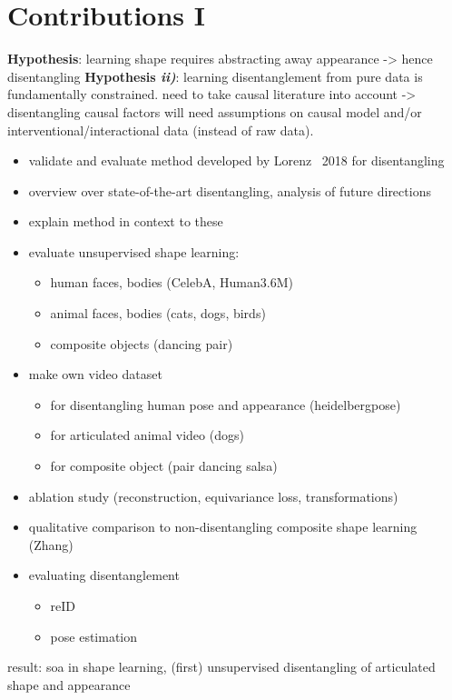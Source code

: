 \section{Contributions I}
	\textbf{Hypothesis}: learning shape requires abstracting away appearance -> hence disentangling
	\textbf{Hypothesis \emph{ii)}}: learning disentanglement from pure data is fundamentally constrained. need to take causal literature into account -> disentangling causal factors will need assumptions on causal model and/or interventional/interactional data (instead of raw data).
	\begin{itemize}
		\item validate and evaluate method developed by Lorenz \etal\ 2018 for disentangling
		\item overview over state-of-the-art disentangling, analysis of future directions
		\item explain method in context to these
		\item evaluate unsupervised shape learning:
			\begin{itemize}
				\item human faces, bodies (CelebA, Human3.6M)
				\item animal faces, bodies (cats, dogs, birds)
				\item composite objects (dancing pair)
			\end{itemize}
		\item make own video dataset
			\begin{itemize}
				\item for disentangling human pose and appearance (heidelbergpose)
				\item for articulated animal video (dogs)
				\item for composite object (pair dancing salsa)
			\end{itemize}
		\item ablation study (reconstruction, equivariance loss, transformations)
		\item qualitative comparison to non-disentangling composite shape learning (Zhang)
		\item evaluating disentanglement
			\begin{itemize}
				\item reID
				\item pose estimation
			\end{itemize}
	\end{itemize}
	result: soa in shape learning, (first) unsupervised disentangling of articulated shape and appearance

